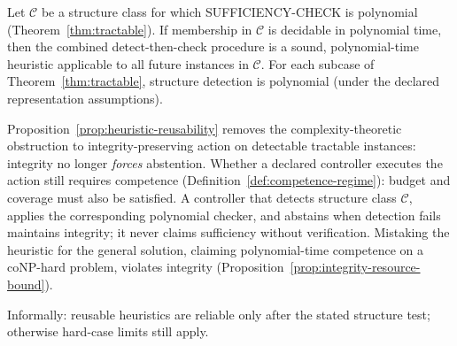 \begin{proposition}\label{prop:heuristic-reusability}
Let $\mathcal{C}$ be a structure class for which SUFFICIENCY-CHECK is polynomial (Theorem~\ref{thm:tractable}). If membership in $\mathcal{C}$ is decidable in polynomial time, then the combined detect-then-check procedure is a sound, polynomial-time heuristic applicable to all future instances in $\mathcal{C}$.
For each subcase of Theorem~\ref{thm:tractable}, structure detection is polynomial (under the declared representation assumptions).
\end{proposition}

\begin{remark}
Proposition~\ref{prop:heuristic-reusability} removes the complexity-theoretic obstruction to integrity-preserving action on detectable tractable instances: integrity no longer \emph{forces} abstention. Whether a declared controller executes the action still requires competence (Definition~\ref{def:competence-regime}): budget and coverage must also be satisfied. A controller that detects structure class $\mathcal{C}$, applies the corresponding polynomial checker, and abstains when detection fails maintains integrity; it never claims sufficiency without verification. Mistaking the heuristic for the general solution, claiming polynomial-time competence on a coNP-hard problem, violates integrity (Proposition~\ref{prop:integrity-resource-bound}).
\end{remark}

Informally: reusable heuristics are reliable only after the stated structure test; otherwise hard-case limits still apply.
